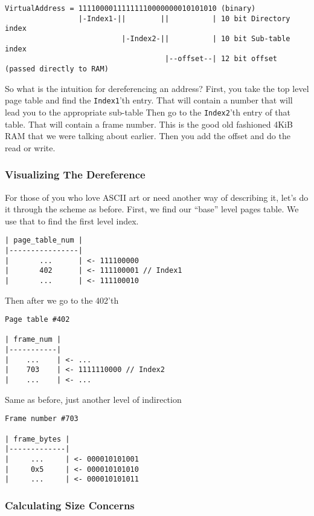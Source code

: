 \begin{verbatim}
VirtualAddress = 11110000111111110000000010101010 (binary)
                 |-Index1-||        ||          | 10 bit Directory index
                           |-Index2-||          | 10 bit Sub-table index
                                     |--offset--| 12 bit offset (passed directly to RAM)
\end{verbatim}

So what is the intuition for dereferencing an address?
First, you take the top level page table and find the \texttt{Index1}'th entry.
That will contain a number that will lead you to the appropriate sub-table
Then go to the \texttt{Index2}'th entry of that table.
That will contain a frame number.
This is the good old fashioned 4KiB RAM that we were talking about earlier.
Then you add the offset and do the read or write.

\subsubsection{Visualizing The Dereference}

For those of you who love ASCII art or need another way of describing it, let's do it through the scheme as before.
First, we find our ``base'' level pages table.
We use that  to find the first level index.

\begin{verbatim}
| page_table_num |
|----------------|
|       ...      | <- 111100000
|       402      | <- 111100001 // Index1
|       ...      | <- 111100010
\end{verbatim}

Then after we go to the 402'th 


\begin{verbatim}
Page table #402

| frame_num |
|-----------|
|    ...    | <- ...
|    703    | <- 1111110000 // Index2
|    ...    | <- ...
\end{verbatim}

Same as before, just another level of indirection

\begin{verbatim}
Frame number #703

| frame_bytes |
|-------------|
|     ...     | <- 000010101001
|     0x5     | <- 000010101010
|     ...     | <- 000010101011
\end{verbatim}

\subsubsection{Calculating Size Concerns}

